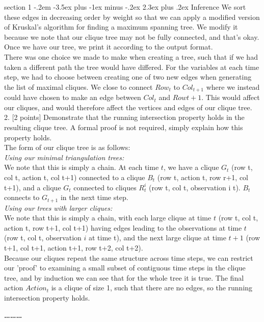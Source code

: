 \documentclass[12pt]{article}
\makeatletter
\newenvironment{problem}{\@startsection
       {section}
       {1}
       {-.2em}
       {-3.5ex plus -1ex minus -.2ex}
       {2.3ex plus .2ex}
       {\pagebreak[3]%
       \large\bf\noindent{Problem }
       }
       }
       {%
       \begin{center}\large\bf \ldots\ldots\ldots\end{center}}
\makeatother
\begin{document}
\begin{problem}{Inference}
We sort these edges in decreasing order by weight so that we can apply
a modified version of Kruskal's algorithm for finding a maximum spanning
tree.  We modify it because we note that our clique tree may not be 
fully connected, and that's okay.\\

Once we have our tree, we print it according to the output format.\\

There was one choice we made to make when creating a tree, such that if
we had taken a different path the tree would have differed.  For the 
variables at each time step, we had to choose between creating one of 
two new edges when generating the list of maximal cliques.  We close to
connect $Row_t$ to $Col_{t+1}$ where we instead could have chosen to make 
an edge between $Col_t$ and $Row{t+1}$.  This would affect our cliques, and
would therefore affect the vertices and edges of our clique tree.\\

2. [2 points] Demonstrate that the running intersection property holds 
in the resulting clique tree. A formal proof is not required, simply 
explain how this property holds.\\

\noindent The form of our clique tree is as follows:\\
\noindent \textit{Using our minimal triangulation trees:}\\
We note that this is simply a chain.  At each time $t$, we have a clique $G_t$ (row t, col t, action t, col t+1) connected to a clique $B_t$ (row t, action t, row r+1, col t+1), and a clique $G_t$ connected to cliques $R_{t}^{i}$ (row t, col t, observation i t).  $B_t$ connects to $G_{t+1}$ in the next time step.\\
\noindent \textit{Using our trees with larger cliques:}\\
We note that this is simply a chain, with each large clique at time $t$ (row t, col t, action t, row t+1, col t+1) having edges leading to the observations at time $t$ (row t, col t, observation $i$ at time t), and the next large clique at time $t+1$ (row t+1, col t+1, action t+1, row t+2, col t+2).\\

\noindent Because our cliques repeat the same structure across time steps, 
we can restrict our 'proof' to examining a small subset of contiguous
time steps in the clique tree, and by induction we can see that for the
whole tree it is true.  The final action $Action_t$ is a clique of size 1,
such that there are no edges, so the running intersection property holds. \\


\end{problem}
\end{document}
